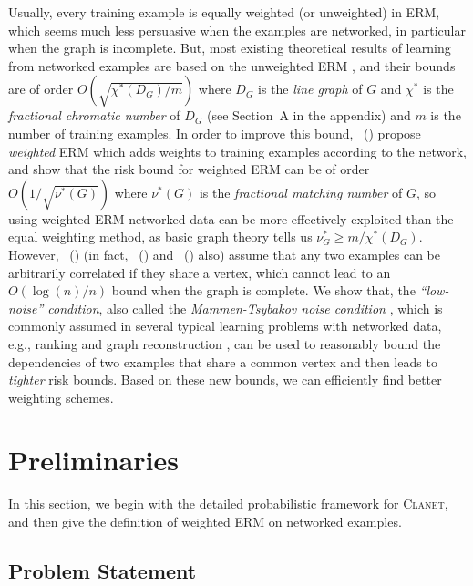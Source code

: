 \documentclass[letterpaper]{article} %
\newcommand{\problemabbr}{\textnormal{C}\textsc{lanet}}
\newcommand{\citet}[1]{\citeauthor{#1}\ (\citeyear{#1})}
\begin{document}
Usually, every training example is equally weighted (or unweighted) in ERM, which seems much less persuasive when the examples are networked, in particular when the graph is incomplete. But, most existing theoretical results of learning from networked examples are based on the unweighted ERM \cite{Usunier2005,ralaivola2009chromatic}, and their bounds are of order $O(\sqrt{\chi^*(D_G)/m})$ where $D_G$ is the \emph{line graph} of $G$ and $\chi^*$ is the \emph{fractional chromatic number} of $D_G$ (see Section~A in the appendix) and $m$ is the number of training examples. 
In order to improve this bound, \citet{wang2017learning} propose \emph{weighted} ERM %
which adds weights to training examples 
according to the network, and show that the risk bound for weighted ERM can be of order $O(1/\sqrt{\nu^*(G)})$ where $\nu^*(G)$ is the \emph{fractional matching number} of $G$, so using weighted ERM networked data can be more effectively exploited than the equal weighting method, as basic graph theory tells us $\nu^*_G\ge m / \chi^*(D_G)$. 
However, \citet{wang2017learning} (in fact, \citet{Usunier2005} and \citet{ralaivola2009chromatic} also) assume that any two examples can be arbitrarily correlated if they share a vertex, which cannot lead to an $O(\log(n)/n)$ bound when the graph is complete. 
We show that, the \emph{``low-noise'' condition}, also called the \emph{Mammen-Tsybakov noise condition}  \cite{Mammen1998Smooth}, which is commonly assumed in several typical learning problems with networked data, e.g., ranking \cite{clemenccon2008ranking} and graph reconstruction \cite{papa2016graph}, can be used to reasonably bound the dependencies of two examples that share a common vertex and then leads to \emph{tighter} risk bounds. 
Based on these new bounds, we can efficiently find better weighting schemes. 

\section{Preliminaries} %
\label{sec:preliminaries}

In this section, we begin with the detailed probabilistic framework for \problemabbr{}, and then give the definition of weighted ERM on networked examples. 

\subsection{Problem Statement} %
\label{sub:problem_statement}
\end{document}
